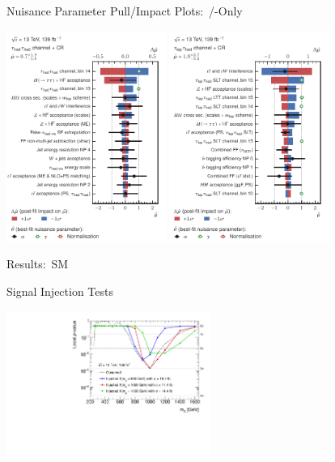 \documentclass[11pt, xcolor={dvipsnames}, aspectratio=169]{beamer}
\begin{document}

\begin{frame}{Nuisance Parameter Pull/Impact Plots:\ \allbold{\hadhad}/\allbold{\lephad}-Only}
  \centering

  \includegraphics[width=0.39\textwidth]{results_nonres/rankings/ranking_nonres_hadhad}\hspace*{3em}
  \includegraphics[width=0.39\textwidth]{results_nonres/rankings/ranking_nonres_lephad}
\end{frame}


\begin{frame}{Results:\ SM~\allbold{\HH}}
  \centering\footnotesize

  
\end{frame}


\begin{frame}{Signal Injection Tests}
  \centering

  \includegraphics[width=0.5\textwidth]{results_res/injection}
\end{frame}
\end{document}
